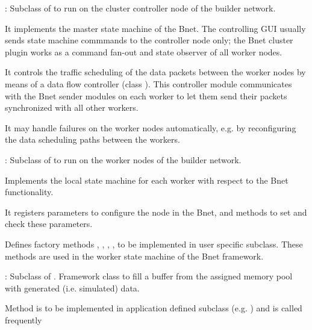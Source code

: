 \begin{compactdesc}
\item[\class{bnet::ClusterPlugin}] : Subclass of  to run on 
   the cluster controller node of the builder network. 
\begin{compactenum}
      \item It implements the master state machine of the Bnet. 
      The controlling GUI usually sends state machine commmands 
      to the controller node only; the Bnet cluster plugin works as 
      a command fan-out and state observer of all worker nodes.
      \item It controls the traffic scheduling of the data packets between 
      the worker nodes by means of a data flow controller 
      (class ). This controller module communicates 
      with the Bnet sender modules on each worker to let them send their 
      packets synchronized with all other workers. 
      \item It may handle failures on the worker nodes automatically, e.g. 
      by reconfiguring the data scheduling paths between the workers.
\end{compactenum}
\item[\class{bnet::WorkerPlugin}] : Subclass of  to run on 
   the worker nodes of the builder network. 
\begin{compactenum}
  \item Implements the local state machine for each worker with respect 
      to the Bnet functionality. 
  \item It registers parameters to configure the node in the Bnet, 
      and methods to set and check these parameters.
  \item Defines factory methods , , 
      , ,  to be implemented 
      in user specific subclass. These methods are used in the worker state 
      machine of the Bnet framework.
\end{compactenum}
\item[\class{bnet::GeneratorModule}] : Subclass of . Framework class 
   to fill a buffer from the assigned memory pool with generated 
   (i.e. simulated) data.
\begin{compactenum}
  \item Method  is to be implemented in application 
      defined subclass (e.g. ) and is called frequently 

\end{compactenum}
\end{compactdesc}
